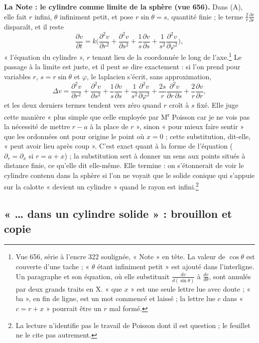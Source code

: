 \documentclass[11pt,a4paper]{article}
\begin{document}
\textbf{La Note : le cylindre comme limite de la sphère (vue 656).} Dans (A),
elle fait $r$ infini, $\theta$ infiniment petit, et pose $r\sin\theta = s$,
quantité finie ; le terme $\frac2r\frac{\partial v}{\partial r}$ disparaît, et
il reste
\[
\frac{\partial v}{\partial t} = k\Big(\frac{\partial^2 v}{\partial r^2} +
\frac{\partial^2 v}{\partial s^2} + \frac1s\frac{\partial v}{\partial s} +
\frac{1}{s^2}\frac{\partial^2 v}{\partial\varphi^2}\Big),
\]
« l'équation du cylindre », $r$ tenant lieu de la coordonnée le long de
l'axe.\footnote{Vue 656, série à l'encre 322 soulignée, « Note » en tête. La
valeur de $\cos\theta$ est couverte d'une tache ; « $\theta$ étant infiniment
petit » est ajouté dans l'interligne. Un paragraphe et son équation, où elle
substituait $\frac{dv}{d(\sin\theta)}$ à $\frac{dv}{d\theta}$, sont annulés par
deux grands traits en X. « que $x$ » est une seule lettre lue avec doute ;
« ba », en fin de ligne, est un mot commencé et laissé ; la lettre lue $c$ dans
« $c = r + x$ » pourrait être un $r$ mal formé.} Le passage à la limite est
juste, et il peut se dire exactement : si l'on prend pour variables $r$, $s =
r\sin\theta$ et $\varphi$, le laplacien s'écrit, sans approximation,
\[
\Delta v = \frac{\partial^2 v}{\partial r^2} + \frac{\partial^2 v}{\partial s^2}
+ \frac1s\frac{\partial v}{\partial s} + \frac{1}{s^2}\frac{\partial^2
v}{\partial\varphi^2} + \frac{2s}{r}\frac{\partial^2 v}{\partial r\,\partial s}
+ \frac2r\frac{\partial v}{\partial r},
\]
et les deux derniers termes tendent vers zéro quand $r$ croît à $s$ fixé.
Elle juge cette manière « plus simple que celle employée par M\textsuperscript{r}
Poisson car je ne vois pas la nécessité de mettre $r - a$ à la place de $r$ »,
sinon « pour mieux faire sentir » que les ordonnées ont pour origine le point
où $x = 0$ ; cette substitution, dit-elle, « peut avoir lieu après coup ».
C'est exact quant à la forme de l'équation ($\partial_r = \partial_x$ si $r =
a + x$) ; la substitution sert à donner un sens aux points situés à distance
finie, ce qu'elle dit elle-même. Elle termine : on s'étonnerait de voir le
cylindre contenu dans la sphère si l'on ne voyait que le solide conique qui
s'appuie sur la calotte « devient un cylindre » quand le rayon est
infini.\footnote{La lecture n'identifie pas le travail de Poisson dont il est
question ; le feuillet ne le cite pas autrement.}

\subsection*{« … dans un cylindre solide » : brouillon et copie}
\end{document}

